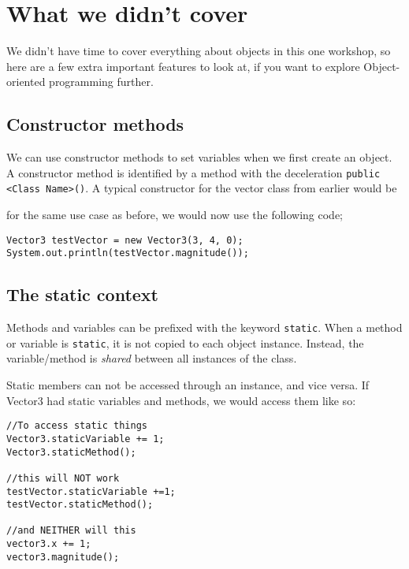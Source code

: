 \section{What we didn't cover}

	We didn't have time to cover everything about objects in this one workshop, so here are a few extra important features to look at, if you want to explore Object-oriented programming further.
	
	\subsection*{Constructor methods}
	
		We can use constructor methods to set variables when we first create an object.
		\iftoggle{isPRINT}{}{The constructor is called when you use the keyword \texttt{new}. When we called \texttt{new} in our programs before, a default constructor was used which does not set any variables.}		
		A constructor method is identified by a method with the deceleration \texttt{public <Class Name>()}. A typical constructor for the vector class from earlier would be
		
		
		
		for the same use case as before, we would now use the following code;
		
		\begin{lstlisting}[style=Java, numbers=none]
Vector3 testVector = new Vector3(3, 4, 0);
System.out.println(testVector.magnitude());
		\end{lstlisting}
		
	\subsection*{The static context}
	
		Methods and variables can be prefixed with the keyword \texttt{static}. When a method or variable is \texttt{static}, it is not copied to each object instance. Instead, the variable/method is \textit{shared} between all instances of the class. 
		
		Static members can not be accessed through an instance, and vice versa. If Vector3 had static variables and methods, we would access them like so:
		
		\begin{lstlisting}[style=Java, numbers=none]
//To access static things
Vector3.staticVariable += 1;
Vector3.staticMethod();

//this will NOT work
testVector.staticVariable +=1;
testVector.staticMethod();

//and NEITHER will this
vector3.x += 1;
vector3.magnitude();
		\end{lstlisting}
		
